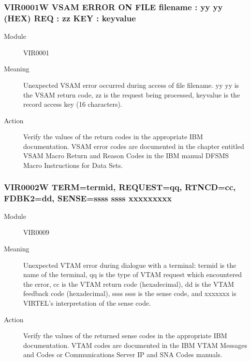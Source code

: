 \documentclass[letterpaper,10pt,english]{sphinxmanual}
\begin{document}
\subsubsection{VIR0001W VSAM ERROR ON FILE filename : yy yy (HEX) REQ : zz KEY : keyvalue}
\label{\detokenize{messages:vir0001w-vsam-error-on-file-filename-yy-yy-hex-req-zz-key-keyvalue}}\begin{description}
\item[{Module}] \leavevmode
VIR0001

\item[{Meaning}] \leavevmode
Unexpected VSAM error occurred during access of file filename. yy yy is the VSAM return code, zz is the request being processed, keyvalue is the record access key (16 characters).

\item[{Action}] \leavevmode
Verify the values of the return codes in the appropriate IBM documentation. VSAM error codes are documented in the chapter entitled VSAM Macro Return and Reason Codes in the IBM manual DFSMS Macro Instructions for Data Sets.

\end{description}


\subsubsection{VIR0002W TERM=termid, REQUEST=qq, RTNCD=cc, FDBK2=dd, SENSE=ssss ssss xxxxxxxxx}
\label{\detokenize{messages:vir0002w-term-termid-request-qq-rtncd-cc-fdbk2-dd-sense-ssss-ssss-xxxxxxxxx}}\begin{description}
\item[{Module}] \leavevmode
VIR0009

\item[{Meaning}] \leavevmode
Unexpected VTAM error during dialogue with a terminal: termid is the name of the terminal, qq is the type of VTAM request which encountered the error, cc is the VTAM return code (hexadecimal), dd is the VTAM feedback code (hexadecimal), ssss ssss is the sense code, and xxxxxxx is VIRTEL’s interpretation of the sense code.

\item[{Action}] \leavevmode
Verify the values of the returned sense codes in the appropriate IBM documentation. VTAM codes are documented in the IBM VTAM Messages and Codes or Communications Server IP and SNA Codes manuals.

\end{description}
\end{document}

